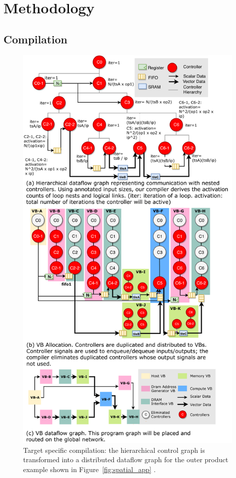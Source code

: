 \section{Methodology}
\label{sec:method}
\subsection{Compilation} \label{sec:compiler}
\begin{figure}
\centering
\includegraphics[width=1\columnwidth]{figs/controller.pdf}
\caption{Target specific compilation: the hierarchical control graph is transformed into a distributed dataflow graph
  for the outer product example shown in Figure~\ref{fig:spatial_app} .}\label{fig:controller}
\end{figure}

